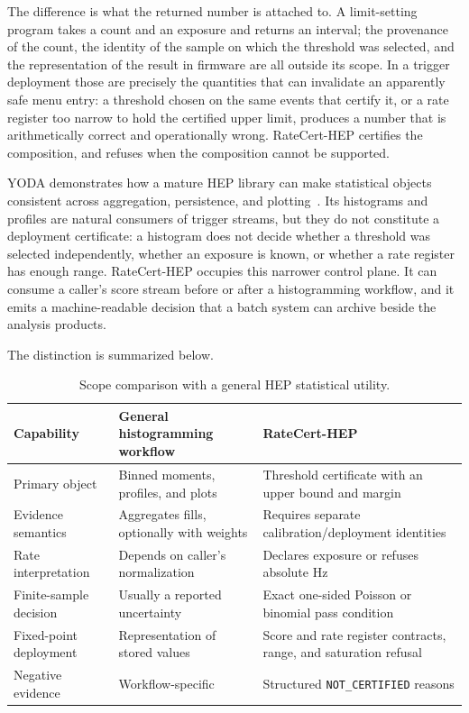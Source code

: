 \documentclass[preprint,12pt]{elsarticle}
\begin{document}
The difference is what the returned number is attached to.  A limit-setting
program takes a count and an exposure and returns an interval; the provenance
of the count, the identity of the sample on which the threshold was selected,
and the representation of the result in firmware are all outside its scope.  In
a trigger deployment those are precisely the quantities that can invalidate an
apparently safe menu entry: a threshold chosen on the same events that certify
it, or a rate register too narrow to hold the certified upper limit, produces a
number that is arithmetically correct and operationally wrong.  RateCert-HEP
certifies the composition, and refuses when the composition cannot be
supported.

YODA demonstrates how a mature HEP library can make statistical objects
consistent across aggregation, persistence, and plotting~\cite{YODA2}.  Its
histograms and profiles are natural consumers of trigger streams, but they do
not constitute a deployment certificate: a histogram does not decide whether a
threshold was selected independently, whether an exposure is known, or whether
a rate register has enough range.  RateCert-HEP occupies this narrower control
plane.  It can consume a caller's score stream before or after a histogramming
workflow, and it emits a machine-readable decision that a batch system can
archive beside the analysis products.

The distinction is summarized below.

\begin{table}[t]
\centering\small
\caption{Scope comparison with a general HEP statistical utility.}
\label{tab:scope}
\begin{tabular}{p{}p{}p{}}
\toprule
Capability & General histogramming workflow & RateCert-HEP \\
\midrule
Primary object & Binned moments, profiles, and plots & Threshold certificate with an upper bound and margin \\
Evidence semantics & Aggregates fills, optionally with weights & Requires separate calibration/deployment identities \\
Rate interpretation & Depends on caller's normalization & Declares exposure or refuses absolute Hz \\
Finite-sample decision & Usually a reported uncertainty & Exact one-sided Poisson or binomial pass condition \\
Fixed-point deployment & Representation of stored values & Score and rate register contracts, range, and saturation refusal \\
Negative evidence & Workflow-specific & Structured \texttt{NOT\_CERTIFIED} reasons \\
\bottomrule
\end{tabular}
\end{table}
\end{document}
